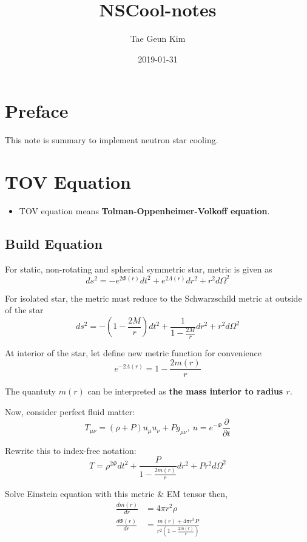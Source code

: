 \documentclass[]{book}
\title{NSCool-notes}
\author{Tae Geun Kim}
\date{2019-01-31}
\providecommand{\tightlist}{%
  \setlength{\itemsep}{0pt}\setlength{\parskip}{0pt}}
\begin{document}
\maketitle

{
\setcounter{tocdepth}{1}
\tableofcontents
}
\hypertarget{preface}{%
\chapter{Preface}\label{preface}}

This note is summary to implement neutron star cooling.

\hypertarget{TOV}{%
\chapter{TOV Equation}\label{TOV}}

\begin{itemize}
\tightlist
\item
  TOV equation means \textbf{Tolman-Oppenheimer-Volkoff equation}.
\end{itemize}

\hypertarget{build-equation}{%
\section{Build Equation}\label{build-equation}}

For static, non-rotating and spherical symmetric star, metric is given as
\[ds^2 = -e^{2\Phi(r)}dt^2 + e^{2\Lambda(r)} dr^2 + r^2 d\Omega^2\]

For isolated star, the metric must reduce to the Schwarzschild metric at outside of the star
\[ds^2 = -\left(1 - \frac{2M}{r}\right) dt^2 + \frac{1}{1 - \frac{2M}{r}} dr^2 + r^2 d\Omega^2\]

At interior of the star, let define new metric function for convenience
\[e^{-2\Lambda(r)} = 1 - \frac{2m(r)}{r}\]

The quantuty \(m(r)\) can be interpreted as \textbf{the mass interior to radius \(r\)}.

Now, consider perfect fluid matter:
\[T_{\mu\nu} = (\rho + P)u_\mu u_\nu + Pg_{\mu\nu}, ~u = e^{-\Phi}\frac{\partial}{\partial t}\]

Rewrite this to index-free notation:
\[T = \rho^{2\Phi} dt^2 + \frac{P}{1 - \frac{2m(r)}{r}}dr^2 + Pr^2 d\Omega^2\]

Solve Einstein equation with this metric \& EM tensor then,
\begin{align}
    \frac{dm(r)}{dr} &= 4\pi r^2 \rho \\
    \frac{d\Phi(r)}{dr} &= \frac{m(r) + 4\pi r^3 P}{r^2 \left(1 - \frac{2m(r)}{r}\right)}
\end{align}
\end{document}
